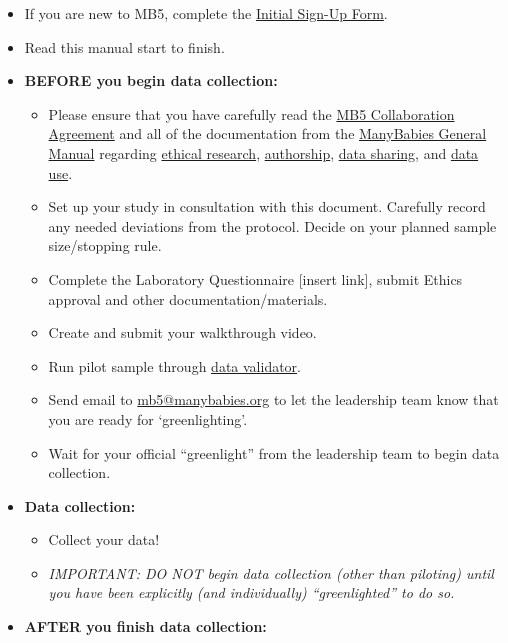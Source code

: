 \documentclass[
]{book}
\providecommand{\tightlist}{%
  \setlength{\itemsep}{0pt}\setlength{\parskip}{0pt}}
\begin{document}
\begin{itemize}
\tightlist
\item
  If you are new to MB5, complete the \href{https://docs.google.com/forms/d/e/1FAIpQLSdJnP3KO_dCmj-jNPHs0XP2j3q66g1RI6L31dwhCzhwhoJeoA/viewform}{Initial Sign-Up Form}.
\item
  Read this manual start to finish.
\item
  \textbf{BEFORE you begin data collection:}

  \begin{itemize}
  \tightlist
  \item
    Please ensure that you have carefully read the \href{https://docs.google.com/document/d/1vbTDmH6euda5pJN4uyds3zsnQ1DXrW9wpHogwC-5TSk/edit?usp=sharing}{MB5 Collaboration Agreement} and all of the documentation from the \href{https://docs.google.com/document/d/1dZ3sF2UcxvpkfOfKSKFeObTMZRbpUYloMUiPYtZy0ng/edit?usp=sharing}{ManyBabies General Manual} regarding \href{https://docs.google.com/document/d/1dZ3sF2UcxvpkfOfKSKFeObTMZRbpUYloMUiPYtZy0ng/edit\#heading=h.22i70rxou3ha}{ethical research}, \href{https://docs.google.com/document/d/1dZ3sF2UcxvpkfOfKSKFeObTMZRbpUYloMUiPYtZy0ng/edit\#heading=h.9ty2g48mpe0t}{authorship}, \href{https://docs.google.com/document/d/1dZ3sF2UcxvpkfOfKSKFeObTMZRbpUYloMUiPYtZy0ng/edit\#heading=h.aunbjkpwxhf3}{data sharing}, and \href{https://docs.google.com/document/d/1dZ3sF2UcxvpkfOfKSKFeObTMZRbpUYloMUiPYtZy0ng/edit\#heading=h.6h67zsyeiveg}{data use}.
  \item
    Set up your study in consultation with this document. Carefully record any needed deviations from the protocol. Decide on your planned sample size/stopping rule.
  \item
    Complete the Laboratory Questionnaire {[}insert link{]}, submit Ethics approval and other documentation/materials.
  \item
    Create and submit your walkthrough video.
  \item
    Run pilot sample through \href{https://manybabies.org/validator/}{data validator}.
  \item
    Send email to \url{mb5@manybabies.org} to let the leadership team know that you are ready for `greenlighting'.
  \item
    Wait for your official ``greenlight'' from the leadership team to begin data collection.
  \end{itemize}
\item
  \textbf{Data collection:}

  \begin{itemize}
  \tightlist
  \item
    Collect your data!
  \item
    \emph{IMPORTANT: DO NOT begin data collection (other than piloting) until you have been explicitly (and individually) ``greenlighted'' to do so.}
  \end{itemize}
\item
  \textbf{AFTER you finish data collection:}


\end{itemize}
\end{document}
